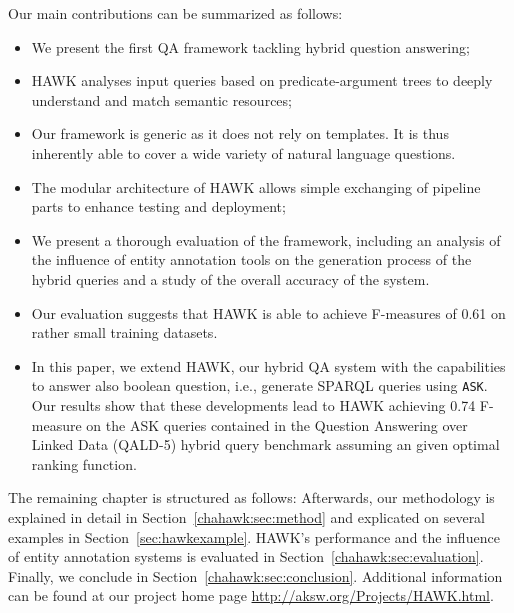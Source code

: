 
Our main contributions can be summarized as follows:
 \begin{itemize}
 \item We present the first QA framework tackling hybrid question answering;
 \item HAWK analyses input queries based on predicate-argument trees to deeply understand and match semantic resources;
 \item Our framework is generic as it does not rely on templates. It is thus inherently able to cover a wide variety of natural language questions. %
 \item The modular architecture of HAWK allows simple exchanging of pipeline parts to enhance testing and deployment;
 \item We present a thorough evaluation of the framework, including an analysis of the influence of entity annotation tools on the generation process of the hybrid queries and a study of the overall accuracy of the system. 
 \item Our evaluation suggests that HAWK is able to achieve F-measures of 0.61 on rather small training datasets.
 \item In this paper, we extend HAWK, our hybrid QA system with the capabilities to answer also boolean question, i.e., generate SPARQL queries using \texttt{ASK}. Our results show that these developments lead to HAWK achieving 0.74 F-measure on the ASK queries contained in the Question Answering over Linked Data (QALD-5) hybrid query benchmark assuming an given optimal ranking function.
 \end{itemize}

The remaining chapter is structured as follows:
Afterwards, our methodology is explained in detail in Section~\ref{chahawk:sec:method} and explicated on several examples in Section~\ref{sec:hawkexample}.
HAWK's performance and the influence of entity annotation systems is evaluated in Section~\ref{chahawk:sec:evaluation}. 
Finally, we conclude in Section~\ref{chahawk:sec:conclusion}. Additional information can be found at our project home page \url{http://aksw.org/Projects/HAWK.html}.

